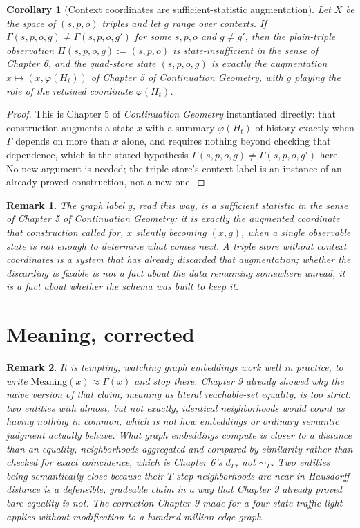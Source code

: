 \documentclass[11pt]{report}
\newtheorem{remark}{Remark}[chapter]
\newtheorem{corollary}{Corollary}[chapter]
\begin{document}
\begin{corollary}[Context coordinates are sufficient-statistic augmentation]
\label{cor:context-augmentation}
Let $X$ be the space of $(s,p,o)$ triples and let $g$ range over
contexts. If $\Gamma(s,p,o,g) \neq \Gamma(s,p,o,g')$ for some $s,p,o$
and $g \neq g'$, then the plain-triple observation $\Pi(s,p,o,g) :=
(s,p,o)$ is state-insufficient in the sense of Chapter 6, and the
quad-store state $(s,p,o,g)$ is exactly the augmentation
$x \mapsto (x, \varphi(H_t))$ of Chapter 5 of \emph{Continuation
Geometry}, with $g$ playing the role of the retained coordinate
$\varphi(H_t)$.
\end{corollary}
\begin{proof}
This is Chapter 5 of \emph{Continuation Geometry} instantiated
directly: that construction augments a state $x$ with a summary
$\varphi(H_t)$ of history exactly when $\Gamma$ depends on more than
$x$ alone, and requires nothing beyond checking that dependence, which
is the stated hypothesis $\Gamma(s,p,o,g) \neq \Gamma(s,p,o,g')$
here. No new argument is needed; the triple store's context label is
an instance of an already-proved construction, not a new one.
\end{proof}

\begin{remark}
The graph label $g$, read this way, is a sufficient statistic in the
sense of Chapter 5 of \emph{Continuation Geometry}: it is exactly the
augmented coordinate that construction called for, $x$ silently
becoming $(x, g)$, when a single observable state is not enough to
determine what comes next. A triple store without context coordinates
is a system that has already discarded that augmentation; whether the
discarding is fixable is not a fact about the data remaining somewhere
unread, it is a fact about whether the schema was built to keep it.
\end{remark}

\section*{Meaning, corrected}

\begin{remark}
It is tempting, watching graph embeddings work well in practice, to
write $\mathrm{Meaning}(x) \approx \Gamma(x)$ and stop there. Chapter
9 already showed why the naive version of that claim, meaning as
literal reachable-set equality, is too strict: two entities with
almost, but not exactly, identical neighborhoods would count as
having nothing in common, which is not how embeddings or ordinary
semantic judgment actually behave. What graph embeddings compute is
closer to a distance than an equality, neighborhoods aggregated and
compared by similarity rather than checked for exact coincidence,
which is Chapter 6's $d_\Gamma$, not $\sim_\Gamma$. Two entities being
semantically close because their $T$-step neighborhoods are near in
Hausdorff distance is a defensible, gradeable claim in a way that
Chapter 9 already proved bare equality is not. The correction Chapter
9 made for a four-state traffic light applies without modification to
a hundred-million-edge graph.
\end{remark}
\end{document}
